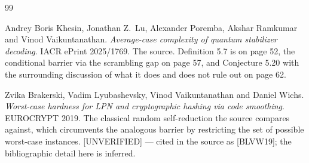\documentclass{aicr-conjecture}
\begin{document}
\begin{aicrbibliography}{99}

Andrey Boris Khesin, Jonathan Z.\ Lu, Alexander Poremba, Akshar Ramkumar
and Vinod Vaikuntanathan.
\emph{Average-case complexity of quantum stabilizer decoding}.
IACR ePrint 2025/1769.
The source. Definition 5.7 is on page 52, the conditional barrier via the
scrambling gap on page 57, and Conjecture 5.20 with the surrounding
discussion of what it does and does not rule out on page 62.

Zvika Brakerski, Vadim Lyubashevsky, Vinod Vaikuntanathan and Daniel
Wichs.
\emph{Worst-case hardness for LPN and cryptographic hashing via code
smoothing}.
EUROCRYPT 2019.
The classical random self-reduction the source compares against, which
circumvents the analogous barrier by restricting the set of possible
worst-case instances. [UNVERIFIED] --- cited in the source as [BLVW19];
the bibliographic detail here is inferred.

\end{aicrbibliography}
\end{document}

